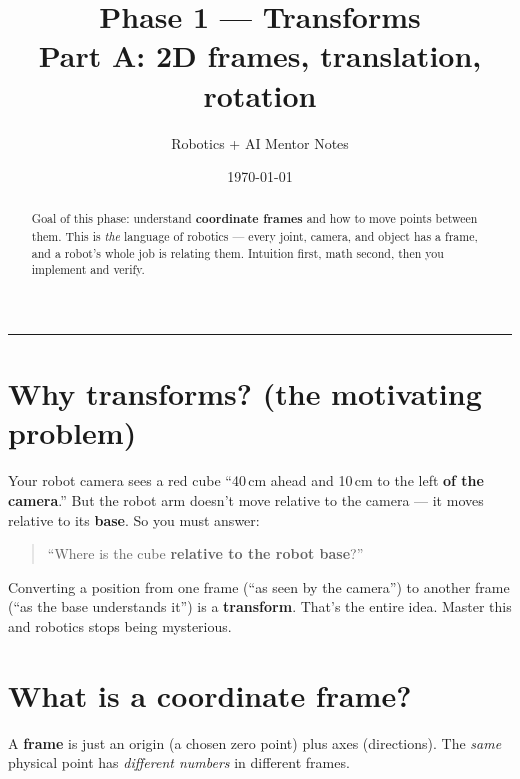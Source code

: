 \documentclass[11pt]{article}
\title{\textbf{Phase 1 --- Transforms}\\[4pt]
\large Part A: 2D frames, translation, rotation}
\author{Robotics + AI Mentor Notes}
\date{\today}
\begin{document}
\maketitle

\begin{abstract}
\noindent Goal of this phase: understand \textbf{coordinate frames} and how to move
points between them. This is \emph{the} language of robotics --- every joint,
camera, and object has a frame, and a robot's whole job is relating them.
Intuition first, math second, then you implement and verify.
\end{abstract}

\tableofcontents
\bigskip
\hrule

\section{Why transforms? (the motivating problem)}

Your robot camera sees a red cube ``40\,cm ahead and 10\,cm to the left
\textbf{of the camera}.'' But the robot arm doesn't move relative to the camera ---
it moves relative to its \textbf{base}. So you must answer:

\begin{quote}
``Where is the cube \textbf{relative to the robot base}?''
\end{quote}

Converting a position from one frame (``as seen by the camera'') to another frame
(``as the base understands it'') is a \textbf{transform}. That's the entire idea.
Master this and robotics stops being mysterious.

\section{What is a coordinate frame?}

A \textbf{frame} is just an origin (a chosen zero point) plus axes (directions).
The \emph{same} physical point has \emph{different numbers} in different frames.

\begin{center}
\end{center}
\end{document}
